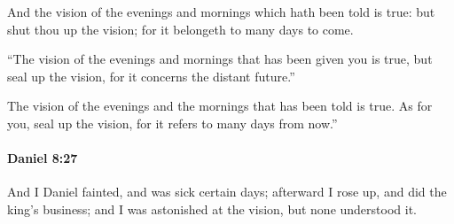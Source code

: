 			\begin{versebox}
					\item[BHS] 
					\item[LXX] 
					\item[ASV] And the vision of the evenings and mornings which hath been told is true: but shut thou up the vision; for it belongeth to many days to come.
					\item[NIV] “The vision of the evenings and mornings that has been given you is true, but seal up the vision, for it concerns the distant future.”
					\item[NRSV] The vision of the evenings and the mornings that has been told is true. As for you, seal up the vision, for it refers to many days from now.”
			\end{versebox}

		\paragraph{Daniel 8:27} %
			\label{DANIEL-8-27}

			And I Daniel fainted, and was sick certain days; afterward I rose up, and did the king’s business; and I was astonished at the vision, but none understood it.

